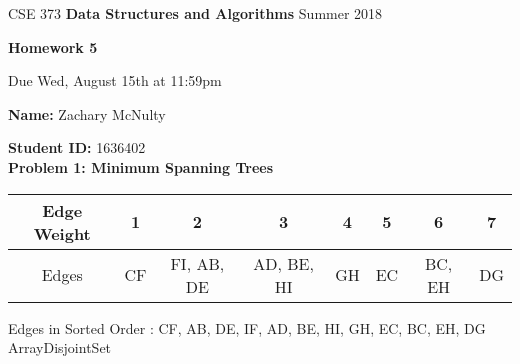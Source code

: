 \documentclass[12pt,a4paper]{article}
\begin{document}
%
%
\begin{center}
CSE 373    \hspace{0.4 cm}  
{\bf Data Structures and Algorithms }
  \hspace{0.4 cm}   Summer 2018
\end{center} 
\vspace{-7 mm}
\noindent \hrulefill
\vspace{3 mm}


%
%

\begin{center}
{\bf \Large Homework 5}

Due Wed, August 15th at 11:59pm
\end{center}


{\bf Name:} Zachary McNulty

{\bf Student ID:} 1636402\\

%
%

{\bf\large Problem 1: Minimum Spanning Trees}\\

\begin{tabular}{|c|c|c|c|c|c|c|c|}

\hline
Edge Weight & 1 & 2 & 3 &4 & 5 & 6 & 7 \\
\hline
Edges & CF & FI, AB, DE & AD, BE, HI & GH & EC & BC, EH & DG \\
\hline
\end{tabular}
\vskip 0.1in
Edges in Sorted Order : CF, AB, DE, IF, AD, BE, HI, GH, EC, BC, EH, DG \\


ArrayDisjointSet\\
\end{document}
